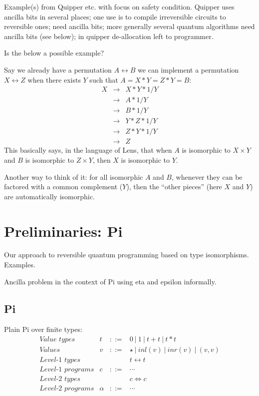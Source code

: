 \documentclass[sigplan,10pt,review,anonymous]{acmart}
\newcommand{\alt}{~|~}
\newcommand{\inlv}[1]{\ensuremath{\mathit{inl}(v)}}
\newcommand{\inrv}[1]{\ensuremath{\mathit{inr}(v)}}
\begin{document}
Example(s) from Quipper etc. with focus on safety condition. Quipper
uses ancilla bits in several places; one use is to compile
irreversible circuits to reversible ones; need ancilla bits; more
generally several quantum algorithms need ancilla bits (see below); in
quipper de-allocation left to programmer.

Is the below a possible example?

Say we already have a permutation $A \leftrightarrow B$
we can implement a permutation $X \leftrightarrow Z$ 
when there exists $Y$ such that $A = X * Y = Z * Y = B$:
\[\begin{array}{rcl}
X &\rightarrow& X * Y * 1/Y \\
  &\rightarrow& A * 1/Y \\
  &\rightarrow&  B * 1/Y \\
  &\rightarrow&  Y * Z * 1/Y \\
  &\rightarrow&  Z * Y * 1/Y \\
  &\rightarrow&  Z
\end{array}\]
This basically says, in the language of Lens, that
when $A$ is isomorphic to $X \times Y$ and
$B$ is isomorphic to $Z \times Y$, then
$X$ is isomorphic to $Y$.

Another way to think of it: for all isomorphic
$A$ and $B$, whenever they can be factored with a
common complement ($Y$), then the ``other pieces''
(here $X$ and $Y$) are automatically isomorphic.

\section{Preliminaries: Pi}

Our approach to reversible quantum programming based on type
isomorphisms. Examples.

Ancilla problem in the context of Pi using eta and epsilon 
informally. 

\subsection{Pi}

Plain Pi over finite types:
\[\begin{array}{lrcl}
\textit{Value types} & t &::=& 0 \alt 1 \alt t+t \alt t*t \\
\textit{Values}      & v &::=& \star \alt \inlv{v} \alt \inrv{v} \alt (v,v) \\
\textit{Level-1 types} &&& t \leftrightarrow t \\
\textit{Level-1 programs} & c &::=& \cdots \\
\textit{Level-2 types} &&& c \Leftrightarrow c \\
\textit{Level-2 programs} & \alpha &::=& \cdots 
\end{array}\]
\end{document}
